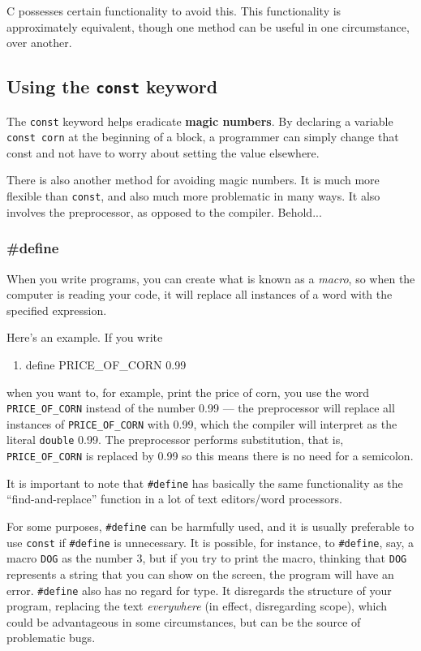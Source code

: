C possesses certain functionality to avoid this. This functionality is
approximately equivalent, though one method can be useful in one circumstance,
over another.

\subsection{Using the \texttt{const} keyword}
The \texttt{const} keyword helps eradicate \textbf{magic numbers}. By declaring
a variable \texttt{const corn} at the beginning of a block, a programmer can
simply change that const and not have to worry about setting the value
elsewhere.

There is also another method for avoiding magic numbers. It is much more
flexible than \texttt{const}, and also much more problematic in many ways. It
also involves the preprocessor, as opposed to the compiler. Behold...

\subsubsection{\#define}
When you write programs, you can create what is known as a \emph{macro}, so
when the computer is reading your code, it will replace all instances of a word
with the specified expression.

Here's an example. If you write
\begin{enumerate}
	\item define PRICE\_OF\_CORN 0.99
\end{enumerate}

when you want to, for example, print the price of corn, you use the word
\texttt{PRICE\_OF\_CORN} instead of the number 0.99 --- the preprocessor will
replace all instances of \texttt{PRICE\_OF\_CORN} with 0.99, which the compiler
will interpret as the literal \texttt{double} 0.99. The preprocessor performs
substitution, that is, \texttt{PRICE\_OF\_CORN} is replaced by 0.99 so this
means there is no need for a semicolon.

It is important to note that \texttt{\#define} has basically the same
functionality as the ``find-and-replace'' function in a lot of text
editors/word processors. 

For some purposes, \texttt{\#define} can be harmfully used, and it is usually
preferable to use \texttt{const} if \texttt{\#define} is unnecessary. It is
possible, for instance, to \texttt{\#define}, say, a macro \texttt{DOG} as the
number 3, but if you try to print the macro, thinking that \texttt{DOG}
represents a string that you can show on the screen, the program will have an
error. \texttt{\#define} also has no regard for type. It disregards the
structure of your program, replacing the text \emph{everywhere} (in effect,
disregarding scope), which could be advantageous in some circumstances, but can
be the source of problematic bugs.

